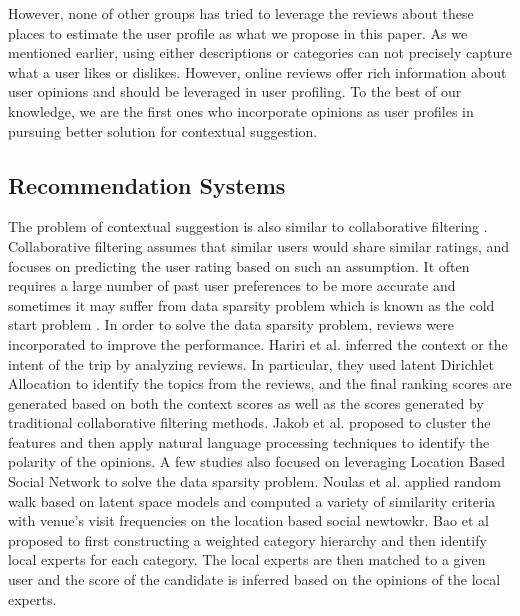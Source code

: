 However, none of other groups has tried to leverage the reviews
about these places to estimate the user profile as what we 
propose in this paper. As we mentioned earlier, using either 
descriptions or categories can not precisely capture what a 
user likes or dislikes. However, online reviews offer rich 
information about user opinions and should be leveraged 
in user profiling. To the best of our knowledge, we are the first ones who incorporate 
opinions as user profiles in pursuing better solution for contextual suggestion.

\subsection{Recommendation Systems} 

The problem of contextual suggestion is also similar to 
collaborative filtering \cite{Su:2009:SCF:1592474.1722966}. 
Collaborative filtering assumes that similar users
would share similar ratings, and focuses on predicting
the user rating based on such an assumption.
It often requires a large number of past user preferences to be more accurate 
and sometimes it may suffer from data sparsity problem which is known 
as the cold start problem \cite{Schein:2002:MMC:564376.564421}.
In order to solve the data sparsity problem, reviews were 
incorporated to improve the performance. 
Hariri et al. \cite{hariricontext} inferred the context or the intent 
of the trip by analyzing reviews. In particular, they used latent Dirichlet 
Allocation to identify the topics from the reviews, and the final 
ranking scores are generated based on both the context scores as well 
as the scores generated by traditional collaborative filtering methods.  
Jakob et al. \cite{Jakob:2009:BSE:1651461.1651473} proposed to 
cluster the features and then apply natural language processing 
techniques to identify the polarity of the opinions.
A few studies also focused on leveraging Location Based Social Network 
to solve the data sparsity problem. 
Noulas et al. \cite{Noulas:2012:RWA:2411131.2411620} applied random 
walk based on latent space models and computed a variety of 
similarity criteria with venue's visit frequencies on the 
location based social newtowkr. 
Bao et al \cite{Bao:2012:LPR:2424321.2424348} proposed to first 
constructing a weighted category hierarchy and then identify  
local experts for each category. The local experts are then matched 
to a given user and the score of the candidate is inferred based on the 
opinions of the local experts.


